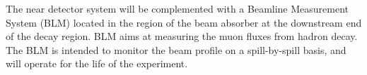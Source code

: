 The near detector system will be complemented with a Beamline Measurement System (BLM) located in the region of the beam absorber at the downstream end of the decay region. BLM aims at measuring the muon fluxes from hadron decay.
The BLM is intended to monitor the beam profile on a spill-by-spill basis, and will operate for the life of the experiment.

